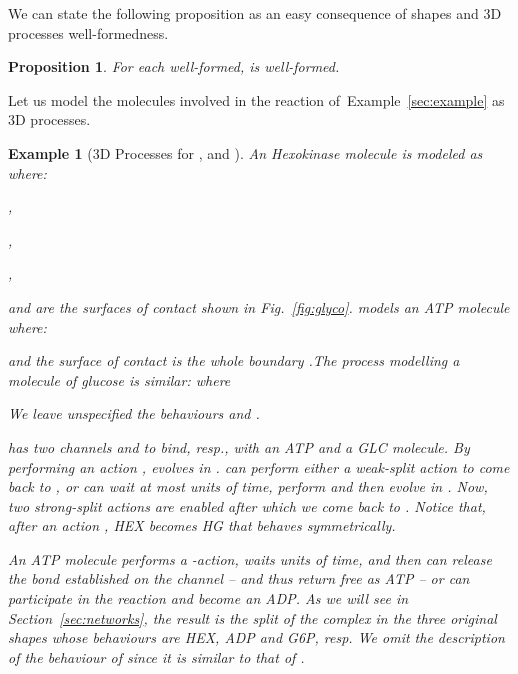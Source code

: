 \documentclass[11pt]{article}
\newtheorem{example}{Example}
\newtheorem{proposition}{Proposition}
\begin{document}
We can state the following proposition as an easy consequence of shapes and 3D processes
well-formedness.

\begin{proposition}
\label{prop:well-formed}
For each  well-formed,  is well-formed.
\end{proposition}

Let us model the molecules involved in the reaction of~Example~\ref{sec:example} as 3D
processes.

\begin{example}[3D Processes for ,  and ]\label{ex:running}
An Hexokinase molecule is modeled as  where:

\smallskip

\noindent ,

\noindent ,

\noindent ,

\smallskip

\noindent and  are the surfaces of contact shown in Fig.~\ref{fig:glyco}.  models an ATP molecule where:

\smallskip



\smallskip

\noindent and the surface of contact  is the whole boundary .The process
modelling a molecule of glucose is similar:  where

\smallskip



\smallskip

\noindent We leave unspecified the behaviours  and .

 has two channels  and
 to bind, resp., with an ATP and a GLC molecule.
By performing an action ,  evolves in .
 can perform either a weak-split action  to come back to
, or can wait at most  units of time, perform  and then evolve in . Now, two strong-split actions are enabled after which we come
back to . Notice that, after an action , {\sf HEX} becomes {\sf HG} that behaves symmetrically.

An ATP molecule performs a -action, waits 
units of time, and then can release the bond established on the channel  -- and thus return free as ATP  -- or can participate in the reaction and become an ADP. As we will see in Section~\ref{sec:networks}, the result is the split of the complex in the three original shapes whose behaviours are {\sf HEX}, {\sf ADP} and {\sf G6P}, resp. We omit the description of the behaviour of  since it is similar to that of .
\end{example}
\end{document}
